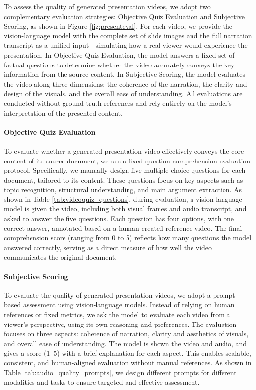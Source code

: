 \documentclass[11pt]{article}
\begin{document}
To assess the quality of generated presentation videos, we adopt two complementary evaluation strategies: Objective Quiz Evaluation and Subjective Scoring, as shown in Figure \ref{fig:presenteval}. For each video, we provide the vision-language model with the complete set of slide images and the full narration transcript as a unified input—simulating how a real viewer would experience the presentation. In Objective Quiz Evaluation, the model answers a fixed set of factual questions to determine whether the video accurately conveys the key information from the source content. In Subjective Scoring, the model evaluates the video along three dimensions: the coherence of the narration, the clarity and design of the visuals, and the overall ease of understanding. All evaluations are conducted without ground-truth references and rely entirely on the model’s interpretation of the presented content.



\paragraph{Objective Quiz Evaluation}

To evaluate whether a generated presentation video effectively conveys the core content of its source document, we use a fixed-question comprehension evaluation protocol. Specifically, we manually design five multiple-choice questions for each document, tailored to its content. These questions focus on key aspects such as topic recognition, structural understanding, and main argument extraction. As shown in Table \ref{tab:videoquiz_questions}, during evaluation, a vision-language model is given the video, including both visual frames and audio transcript, and asked to answer the five questions. Each question has four options, with one correct answer, annotated based on a human-created reference video. The final comprehension score (ranging from 0 to 5) reflects how many questions the model answered correctly, serving as a direct measure of how well the video communicates the original document.


\paragraph{Subjective Scoring}

To evaluate the quality of generated presentation videos, we adopt a prompt-based assessment using vision-language models. Instead of relying on human references or fixed metrics, we ask the model to evaluate each video from a viewer’s perspective, using its own reasoning and preferences. The evaluation focuses on three aspects: coherence of narration, clarity and aesthetics of visuals, and overall ease of understanding. The model is shown the video and audio, and gives a score (1–5) with a brief explanation for each aspect. This enables scalable, consistent, and human-aligned evaluation without manual references. As shown in Table \ref{tab:audio_quality_prompts}, we design different prompts for different modalities and tasks to ensure targeted and effective assessment.
\end{document}
